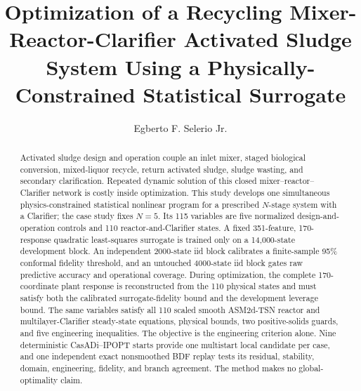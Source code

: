 \documentclass[a4paper,fleqn]{cas-sc}
\begin{document}
\let\WriteBookmarks\relax
\def\floatpagepagefraction{1}
\def\textpagefraction{.001}


\title[mode=title,size=\Large]{Optimization of a Recycling Mixer-Reactor-Clarifier Activated Sludge System Using a Physically-Constrained Statistical Surrogate}

\author[1]{Egberto F. Selerio Jr.}
\cormark[1]



\begin{abstract}
Activated sludge design and operation couple an inlet mixer, staged biological conversion, mixed-liquor recycle, return activated sludge, sludge wasting, and secondary clarification. Repeated dynamic solution of this closed mixer--reactor--Clarifier network is costly inside optimization. This study develops one simultaneous physics-constrained statistical nonlinear program for a prescribed $N$-stage system with a Clarifier; the case study fixes $N=5$. Its 115 variables are five normalized design-and-operation controls and 110 reactor-and-Clarifier states. A fixed 351-feature, 170-response quadratic least-squares surrogate is trained only on a 14,000-state development block. An independent 2000-state iid block calibrates a finite-sample 95\% conformal fidelity threshold, and an untouched 4000-state iid block gates raw predictive accuracy and operational coverage. During optimization, the complete 170-coordinate plant response is reconstructed from the 110 physical states and must satisfy both the calibrated surrogate-fidelity bound and the development leverage bound. The same variables satisfy all 110 scaled smooth ASM2d-TSN reactor and multilayer-Clarifier steady-state equations, physical bounds, two positive-solids guards, and five engineering inequalities. The objective is the engineering criterion alone. Nine deterministic CasADi--IPOPT starts provide one multistart local candidate per case, and one independent exact nonsmoothed BDF replay tests its residual, stability, domain, engineering, fidelity, and branch agreement. The method makes no global-optimality claim.
\end{abstract}
\end{document}
